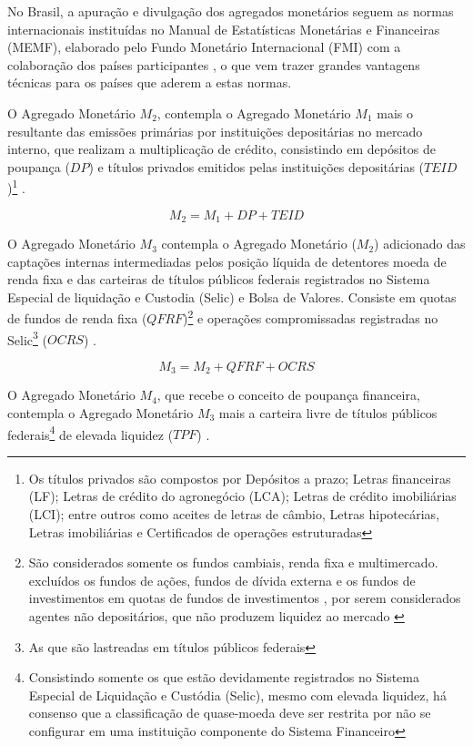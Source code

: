 \documentclass[
  12pt,
  12pt,
  openright,
  oneside,
  a4paper,
  chapter=TITLE,
  section=TITLE,
  subsection=TITLE,
  subsubsection=TITLE,
  english,
  portugues,
  sumario=tradicional]{abntex2}
\begin{document}
No Brasil, a apuração e divulgação dos agregados monetários seguem as normas internacionais instituídas no Manual de Estatísticas Monetárias e Financeiras (MEMF), elaborado pelo Fundo Monetário Internacional (FMI) com a colaboração dos países participantes \cite{sgs:mpa}, o que vem trazer grandes vantagens técnicas para os países que aderem a estas normas.

O Agregado Monetário \(M_2\), contempla o Agregado Monetário \(M_1\) mais o resultante das emissões primárias por instituições depositárias no mercado interno, que realizam a multiplicação de crédito, consistindo em depósitos de poupança (\(DP\)) e títulos privados emitidos pelas instituições depositárias (\(TEID\))\footnote{Os títulos privados são compostos por Depósitos a prazo; Letras financeiras (LF); Letras de crédito do agronegócio (LCA); Letras de crédito imobiliárias (LCI); entre outros como aceites de letras de câmbio, Letras hipotecárias, Letras imobiliárias e Certificados de operações estruturadas} \cite{sgs:mpa}.

\begin{equation}
M_2 = M_1 + DP + TEID
\end{equation}

O Agregado Monetário \(M_3\) contempla o Agregado Monetário (\(M_2\)) adicionado das captações internas intermediadas pelos posição líquida de detentores moeda de renda fixa e das carteiras de títulos públicos federais registrados no Sistema Especial de liquidação e Custodia (Selic) e Bolsa de Valores. Consiste em quotas de fundos de renda fixa (\(QFRF\))\footnote{São considerados somente os fundos cambiais, renda fixa  e multimercado. excluídos os fundos de ações, fundos de dívida externa e os fundos de investimentos em quotas de fundos de investimentos , por serem considerados agentes não depositários, que não produzem liquidez ao mercado \cite{sgs:mpa}} e operações compromissadas registradas no Selic\footnote{As que são lastreadas em títulos públicos federais} (\(OCRS\)) \cite{bcb:2019} \cite{sgs:mpa}.

\begin{equation}
M_3 = M_2 + QFRF + OCRS
\end{equation}

O Agregado Monetário \(M_4\), que recebe o conceito de poupança financeira, contempla o Agregado Monetário \(M_3\) mais a carteira livre de títulos públicos federais\footnote{Consistindo somente os que estão devidamente registrados no Sistema Especial de Liquidação e Custódia (Selic), mesmo com elevada liquidez, há consenso que a classificação de quase-moeda deve ser restrita por não se configurar em uma instituição componente do Sistema Financeiro} de elevada liquidez (\(TPF\)) \cite{bcb:2019}.
\end{document}
